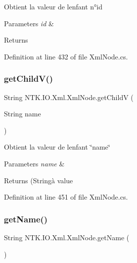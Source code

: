 Obtient la valeur de l\textquotesingle{}enfant n°id 


\begin{DoxyParams}{Parameters}
{\em id} & \\
\hline
\end{DoxyParams}
\begin{DoxyReturn}{Returns}

\end{DoxyReturn}


Definition at line 432 of file Xml\+Node.\+cs.

\mbox{\label{class_n_t_k_1_1_i_o_1_1_xml_1_1_xml_node_aa9da411128e095d36f5d577fd810392b}} 
\subsubsection{\texorpdfstring{getChildV()}{getChildV()}\hspace{0.1cm}{\footnotesize\ttfamily [2/2]}}
{\footnotesize\ttfamily String N\+T\+K.\+I\+O.\+Xml.\+Xml\+Node.\+get\+ChildV (\begin{DoxyParamCaption}\item[{String}]{name }\end{DoxyParamCaption})}



Obtient la valeur de l\textquotesingle{}enfant \char`\"{}name\char`\"{} 


\begin{DoxyParams}{Parameters}
{\em name} & \\
\hline
\end{DoxyParams}
\begin{DoxyReturn}{Returns}
(Stringà value
\end{DoxyReturn}


Definition at line 451 of file Xml\+Node.\+cs.

\mbox{\label{class_n_t_k_1_1_i_o_1_1_xml_1_1_xml_node_adbc72743b3e565f5d537a4acc30886a6}} 
\subsubsection{\texorpdfstring{getName()}{getName()}}
{\footnotesize\ttfamily String N\+T\+K.\+I\+O.\+Xml.\+Xml\+Node.\+get\+Name (\begin{DoxyParamCaption}{ }\end{DoxyParamCaption})}






